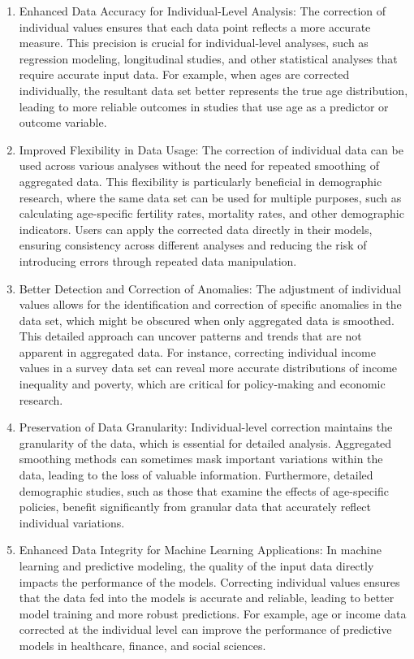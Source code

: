 \documentclass[12pt]{article}
\theoremstyle{plain}
\theoremstyle{definition}
\begin{document}
\begin{enumerate}
\item Enhanced Data Accuracy for Individual-Level Analysis:
   The correction of individual values ensures that each data point reflects a more accurate measure. This precision is crucial for individual-level analyses, such as regression modeling, longitudinal studies, and other statistical analyses that require accurate input data. For example, when ages are corrected individually, the resultant data set better represents the true age distribution, leading to more reliable outcomes in studies that use age as a predictor or outcome variable.
\item Improved Flexibility in Data Usage:
   The correction of individual data can be used across various analyses without the need for repeated smoothing of aggregated data. This flexibility is particularly beneficial in demographic research, where the same data set can be used for multiple purposes, such as calculating age-specific fertility rates, mortality rates, and other demographic indicators. Users can apply the corrected data directly in their models, ensuring consistency across different analyses and reducing the risk of introducing errors through repeated data manipulation.
\item Better Detection and Correction of Anomalies:
   The adjustment of individual values allows for the identification and correction of specific anomalies in the data set, which might be obscured when only aggregated data is smoothed. This detailed approach can uncover patterns and trends that are not apparent in aggregated data. For instance, correcting individual income values in a survey data set can reveal more accurate distributions of income inequality and poverty, which are critical for policy-making and economic research.
\item Preservation of Data Granularity:
   Individual-level correction maintains the granularity of the data, which is essential for detailed analysis. Aggregated smoothing methods can sometimes mask important variations within the data, leading to the loss of valuable information. Furthermore, detailed demographic studies, such as those that examine the effects of age-specific policies, benefit significantly from granular data that accurately reflect individual variations.
\item Enhanced Data Integrity for Machine Learning Applications:
   In machine learning and predictive modeling, the quality of the input data directly impacts the performance of the models. Correcting individual values ensures that the data fed into the models is accurate and reliable, leading to better model training and more robust predictions. For example, age or income data corrected at the individual level can improve the performance of predictive models in healthcare, finance, and social sciences.

\end{enumerate}
\end{document}
